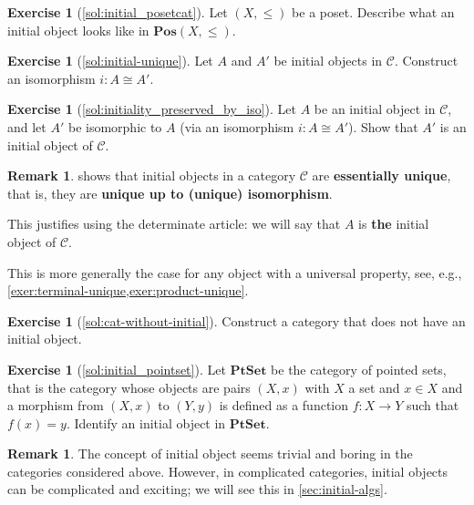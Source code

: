\documentclass[a4paper,10pt]{scrartcl}
\theoremstyle{plain}
\theoremstyle{definition}
\newtheorem{rem}[thm]{Remark}
\newtheorem{exer}[thm]{Exercise}
\newcommand{\Cat}[1]{\mathcal{#1}}
\newcommand{\CC}{\Cat{C}}
\newcommand{\Catb}[1]{\mathbf{#1}}
\newcommand{\PTSET}{\Catb{PtSet}}
\newcommand{\POS}{\Catb{Pos}}
\begin{document}
\begin{exer}[\cref{sol:initial_posetcat}]\label{exer:initial_posetcat}
  Let $(X,\leq)$ be a poset. Describe what an initial object looks like in  $\POS(X,\leq)$.
\end{exer}

\begin{exer}[\cref{sol:initial-unique}]\label{exer:initial-unique}
  Let $A$ and $A'$ be initial objects in $\CC$. Construct an isomorphism $i : A \cong A'$.
\end{exer}

\begin{exer}[\cref{sol:initiality_preserved_by_iso}]\label{exer:initiality_preserved_by_iso}
  Let $A$ be an initial object in $\CC$, and let $A'$ be isomorphic to $A$ (via an isomorphism $i : A \cong A'$).
  Show that $A'$ is an initial object of $\CC$.
\end{exer}

\begin{rem}
   shows that initial objects in a category $\CC$ are \textbf{essentially unique}, that is, they are \textbf{unique up to (unique) isomorphism}.

  
  This justifies using the determinate article: we will say that $A$ is \textbf{the} initial object of $\CC$.

  
  This is more generally the case for any object with a universal property, see, e.g., \cref{exer:terminal-unique,exer:product-unique}.
\end{rem}

\begin{exer}[\cref{sol:cat-without-initial}]\label{exer:cat-without-initial}
  Construct a category that does not have an initial object.
\end{exer}

\begin{exer}[\cref{sol:initial_pointset}]\label{exer:initial_pointset} Let $\PTSET$ be the category of pointed sets, that is the category whose objects are pairs $(X,x)$ with $X$ a set and $x\in X$ and a morphism from $(X,x)$ to $(Y,y)$ is defined as a function $f:X\to Y$ such that $f(x)=y$. Identify an initial object in $\PTSET$.
\end{exer}

\begin{rem}
  The concept of initial object seems trivial and boring in the categories considered above.
  However, in complicated categories, initial objects can be complicated and exciting;
  we will see this in \cref{sec:initial-algs}.
\end{rem}
\end{document}
